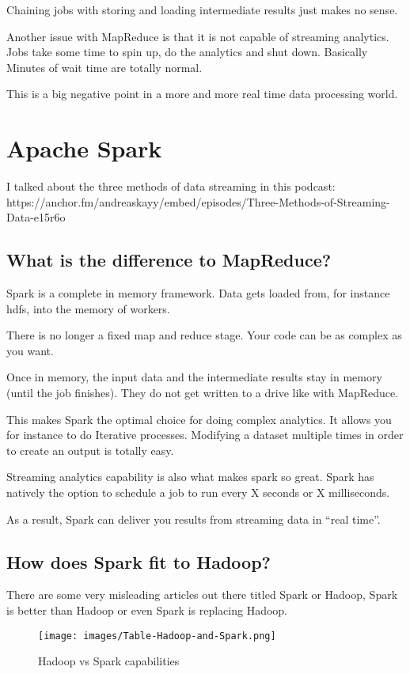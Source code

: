 \documentclass[12pt, numbers=noenddot]{scrreprt} %
\begin{document}
Chaining jobs with storing and loading intermediate results just makes no sense.

Another issue with MapReduce is that it is not capable of streaming analytics. Jobs take some time to spin up, do the analytics and shut down. Basically Minutes of wait time are totally normal.

This is a big negative point in a more and more real time data processing world.



\section{Apache Spark}
I talked about the three methods of data streaming in this podcast: https://anchor.fm/andreaskayy/embed/episodes/Three-Methods-of-Streaming-Data-e15r6o


\subsection{What is the difference to MapReduce?}
Spark is a complete in memory framework. Data gets loaded from, for instance hdfs, into the memory of workers.

There is no longer a fixed map and reduce stage. Your code can be as complex as you want.

Once in memory, the input data and the intermediate results stay in memory (until the job finishes). They do not get written to a drive like with MapReduce.

This makes Spark the optimal choice for doing complex analytics. It allows you for instance to do Iterative processes. Modifying a dataset multiple times in order to create an output is totally easy.

Streaming analytics capability is also what makes spark so great. Spark has natively the option to schedule a job to run every X seconds or X milliseconds.

As a result, Spark can deliver you results from streaming data in “real time”.


\subsection{How does Spark fit to Hadoop?}
There are some very misleading articles out there titled Spark or Hadoop, Spark is better than Hadoop or even Spark is replacing Hadoop.

\begin{figure}[htbp]
  \centering
     \texttt{[image: images/Table-Hadoop-and-Spark.png]}
  \caption{Hadoop vs Spark capabilities}
  \label{fig:Bild1}
\end{figure}
\end{document}
